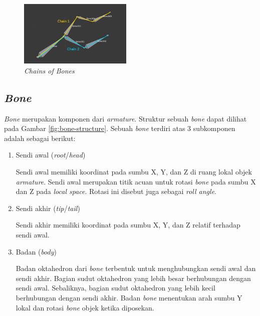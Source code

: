 \begin{figure}[ht]
    \centering
    \includegraphics[width=0.48\textwidth]{resources/chapter-2-chain-of-bones.png}
    \caption{\textit{Chains of Bones} \parencite{blender-manual}}
    \label{fig:chains-of-bones}
\end{figure}

\subsection{\textit{Bone}}

\textit{Bone} merupakan komponen dari \textit{armature}. Struktur sebuah
\textit{bone} dapat dilihat pada Gambar \ref{fig:bone-structure}. Sebuah
\textit{bone} terdiri atas 3 subkomponen adalah sebagai berikut:

\begin{enumerate}

    \item Sendi awal (\textit{root}/\textit{head})

    Sendi awal memiliki koordinat pada sumbu X, Y, dan Z di ruang lokal objek
    \textit{armature}. Sendi awal merupakan titik acuan untuk rotasi
    \textit{bone} pada sumbu X dan Z pada \textit{local space}. Rotasi ini
    disebut juga sebagai \textit{roll angle}.

    \item Sendi akhir (\textit{tip}/\textit{tail})

    Sendi akhir memiliki koordinat pada sumbu X, Y, dan Z relatif terhadap sendi
    awal.

    \item Badan (\textit{body})

    Badan oktahedron dari \textit{bone} terbentuk untuk menghubungkan sendi awal
    dan sendi akhir. Bagian sudut oktahedron yang lebih besar berhubungan dengan
    sendi awal. Sebaliknya, bagian sudut oktahedron yang lebih kecil berhubungan
    dengan sendi akhir. Badan \textit{bone} menentukan arah sumbu Y lokal dan
    rotasi \textit{bone} objek ketika diposekan.

\end{enumerate}

